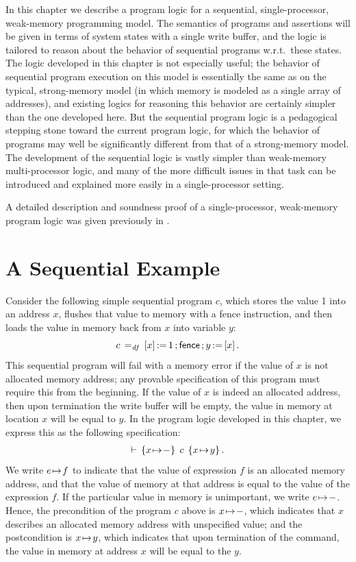 \documentclass[11pt]{report}
\begin{document}
In this chapter we describe a program logic for a sequential, single-processor, weak-memory programming model. The semantics of programs and assertions will be given in terms of system states with a single write buffer, and the logic is tailored to reason about the behavior of sequential programs w.r.t.\ these states. The logic developed in this chapter is not especially useful; the behavior of sequential program execution on this model is essentially the same as on the typical, strong-memory model (in which memory is modeled as a single array of addresses), and existing logics for reasoning this behavior are certainly simpler than the one developed here. But the sequential program logic is a pedagogical stepping stone toward the current program logic, for which the behavior of programs may well be significantly different from that of a strong-memory model. The development of the sequential logic is vastly simpler than weak-memory multi-processor logic, and many of the more difficult issues in that task can be introduced and explained more easily in a single-processor setting. 

A detailed description and soundness proof of a single-processor, weak-memory program logic was given previously in \cite{wmsldetails}. 

\section{A Sequential Example}

Consider the following simple sequential program $c$, which stores the value 1 into an address $x$, flushes that value to memory with a fence instruction, and then loads the value in memory back from $x$ into variable $y$: \[ c \operatorname{\;=_{\mathit{df}}\;} \left[ x \right] \operatorname{:\!=} 1 \operatorname{;} \operatorname{\mathsf{fence}} \operatorname{;} y \operatorname{:\!=} \left[ x \right].\] This sequential program will fail with a memory error if the value of $x$ is not allocated memory address; any provable specification of this program must require this from the beginning. If the value of $x$ is indeed an allocated address, then upon termination the write buffer will be empty, the value in memory at location $x$ will be equal to $y$. In the program logic developed in this chapter, we express this as the following specification: \begin{align}\label{eq:seq-ex-spec} \vdash\,\left\lbrace x \!\mapsto\! - \right\rbrace\;c\;\left\lbrace x \!\mapsto\! y \right\rbrace.\end{align}
We write $e \!\mapsto\! f$ to indicate that the value of expression $f$ is an allocated memory address, and that the value of memory at that address is equal to the value of the expression $f$. If the particular value in memory is unimportant, we write $e \!\mapsto\! -$. Hence, the precondition of the program $c$ above is $x \!\mapsto\! -$, which indicates that $x$ describes an allocated memory address with unspecified value; and the postcondition is $x \!\mapsto\! y$, which indicates that upon termination of the command, the value in memory at address $x$ will be equal to the $y$. 
\end{document}
